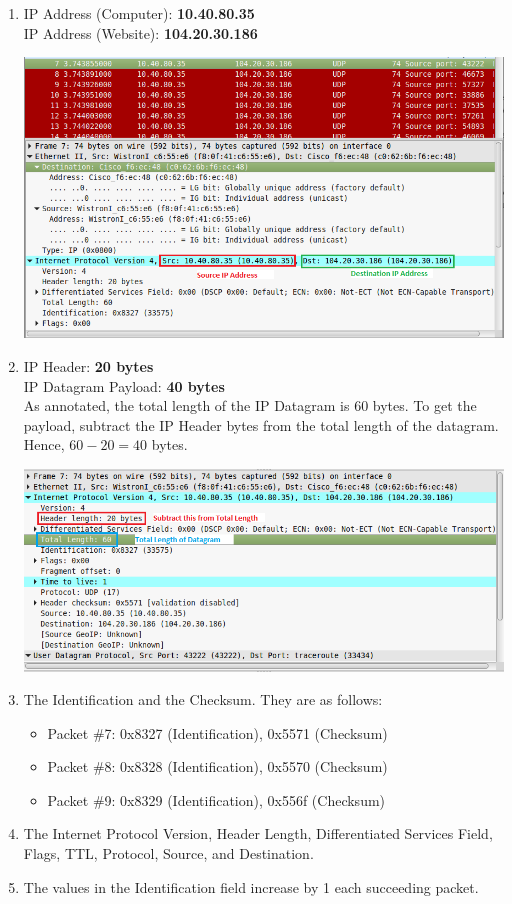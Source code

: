 \documentclass[11pt]{article}
\begin{document}
\begin{enumerate}
\item
IP Address (Computer): \textbf{10.40.80.35} \\
IP Address (Website): \textbf{104.20.30.186}
\begin{center}
\includegraphics[scale=0.4]{Q3}
\end{center}

\item
IP Header: \textbf{20 bytes} \\
IP Datagram Payload: \textbf{40 bytes} \\
As annotated, the total length of the IP Datagram is 60 bytes. To get the payload, subtract the IP Header bytes from the total length of the datagram. Hence, $60 - 20 = 40$ bytes.
\begin{center}
\includegraphics[scale=0.4]{Q4}
\end{center}

\item
The Identification and the Checksum. They are as follows:
\begin{itemize}
\item{Packet \#7: 0x8327 (Identification), 0x5571 (Checksum)}
\item{Packet \#8: 0x8328 (Identification), 0x5570 (Checksum)}
\item{Packet \#9: 0x8329 (Identification), 0x556f (Checksum)}
\end{itemize}

\item
The Internet Protocol Version, Header Length, Differentiated Services Field, Flags, TTL, Protocol, Source, and Destination.

\item
The values in the Identification field increase by 1 each succeeding packet.

\end{enumerate}
\end{document}
